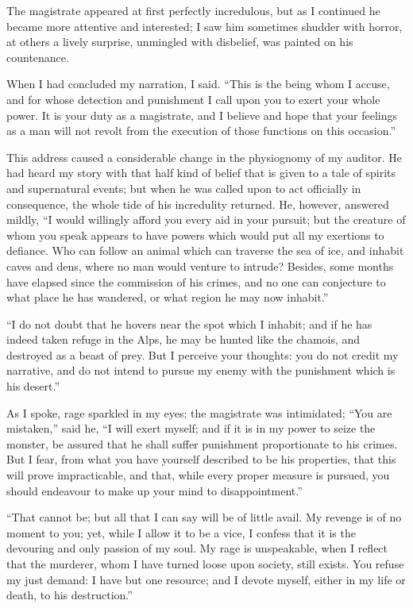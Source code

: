 The magistrate appeared at first perfectly
incredulous, but as I continued
he became more attentive and interested;
I saw him sometimes shudder
with horror, at others a lively surprise,
unmingled with disbelief, was painted
on his countenance.

When I had concluded my narration,
I said. ``This is the being whom I accuse,
and for whose detection and punishment
I call upon you to exert your
whole power. It is your duty as a magistrate,
and I believe and hope that
your feelings as a man will not revolt
from the execution of those functions
on this occasion.''

This address caused a considerable
change in the physiognomy of my
auditor. He had heard my story with
that half kind of belief that is given to
a tale of spirits and supernatural events;
but when he was called upon to act
officially in consequence, the whole
tide of his incredulity returned. He,
however, answered mildly, ``I would
willingly afford you every aid in your
pursuit; but the creature of whom you
speak appears to have powers which
would put all my exertions to defiance.
Who can follow an animal which can
traverse the sea of ice, and inhabit
caves and dens, where no man would
venture to intrude? Besides, some
months have elapsed since the commission
of his crimes, and no one can
conjecture to what place he has wandered,
or what region he may now
inhabit.''

``I do not doubt that he hovers
near the spot which I inhabit; and if
he has indeed taken refuge in the
Alps, he may be hunted like the
chamois, and destroyed as a beast of
prey. But I perceive your thoughts:
you do not credit my narrative, and
do not intend to pursue my enemy
with the punishment which is his
desert.''

As I spoke, rage sparkled in my
eyes; the magistrate was intimidated;
``You are mistaken,'' said he, ``I will
exert myself; and if it is in my power
to seize the monster, be assured that
he shall suffer punishment proportionate
to his crimes. But I fear, from
what you have yourself described to
be his properties, that this will prove
impracticable, and that, while every
proper measure is pursued, you should
endeavour to make up your mind to
disappointment.''

``That cannot be; but all that I
can say will be of little avail. My revenge
is of no moment to you; yet,
while I allow it to be a vice, I confess
that it is the devouring and only passion
of my soul. My rage is unspeakable,
when I reflect that the murderer,
whom I have turned loose upon society,
still exists. You refuse my just
demand: I have but one resource; and
I devote myself, either in my life or
death, to his destruction.''


